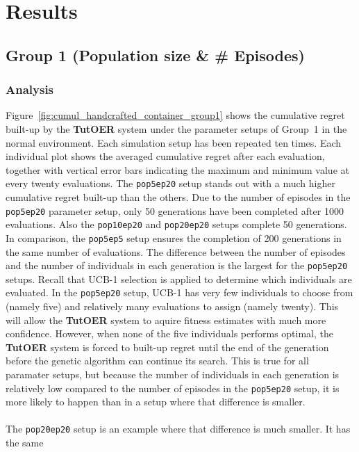 \section{Results}
\label{sec:simulations_results}
\subsection{Group 1 (Population size \& \# Episodes)}
\subsubsection*{Analysis}
Figure~\ref{fig:cumul_handcrafted_container_group1} shows the cumulative
regret built-up by the \textbf{TutOER} system under the parameter setups of Group~1
in the normal environment. Each simulation setup has
been repeated ten times. Each individual plot shows the averaged cumulative
regret after each evaluation, together with vertical error bars indicating the
maximum and minimum value at every twenty evaluations. The \texttt{pop5ep20} setup stands out with a
much higher cumulative regret built-up than the others. Due to the number of episodes in the
\texttt{pop5ep20} parameter setup, only 50 generations have been completed after
1000 evaluations. Also the \texttt{pop10ep20} and \texttt{pop20ep20} setups complete
50 generations. In comparison, the \texttt{pop5ep5} setup ensures the completion
of 200 generations in the same number of evaluations. The difference between
the number of episodes and the number of individuals in each generation is the
largest for the \texttt{pop5ep20} setups. Recall that UCB-1 selection is applied
to determine which individuals are evaluated. In the \texttt{pop5ep20} setup,
UCB-1 has very few individuals to choose from (namely five) and relatively many
evaluations to assign (namely twenty). This will allow the \textbf{TutOER} system
to aquire fitness estimates with much more confidence. However, when none of
the five individuals performs optimal, the \textbf{TutOER} system is forced to
built-up regret until the end of the generation before the genetic algorithm
can continue its search. This is true for all paramater setups, but
because the number of individuals in each generation is relatively low compared
to the number of episodes in the \texttt{pop5ep20} setup, it is more likely to
happen than in a setup where that difference is smaller.\\\\
\noindent
The \texttt{pop20ep20}
setup is an example where that difference is much smaller. It has the same
